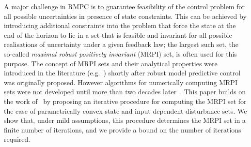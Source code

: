 \documentclass[journal]{IEEEtran}
\theoremstyle{remark}
\theoremstyle{definition}
\begin{document}
A major challenge in RMPC is to guarantee feasibility of the control problem for all possible uncertainties in 
presence of state constraints.
%
This can be achieved by introducing additional constraints into the problem that force the state at the end of the horizon to lie in a set that is feasible and invariant for all possible realisations of uncertainty under a given feedback law; the largest such set, 
the so-called \emph{maximal robust positively invariant} (MRPI) set, is often used for this purpose.
%
The concept of MRPI sets and their analytical properties were introduced in the literature (e.g.~\cite{Bertsekas:1971,Glover:1971}) shortly after robust model predictive control was originally proposed. However algorithms for numerically 
computing MRPI sets were not developed until more than two decades later~\cite{Blanchini:1994,DeSantis:1994,Kolmanovsky:1998}.
%
This paper builds on the work of~\cite{Kolmanovsky:1998,Rakovic06} by proposing an iterative procedure for computing the MRPI set for the case of parametrically convex state and input dependent disturbance sets. We show that, under mild assumptions, this procedure determines the MRPI set in a finite number of iterations, and we provide a bound on the number of iterations required.
\end{document}
